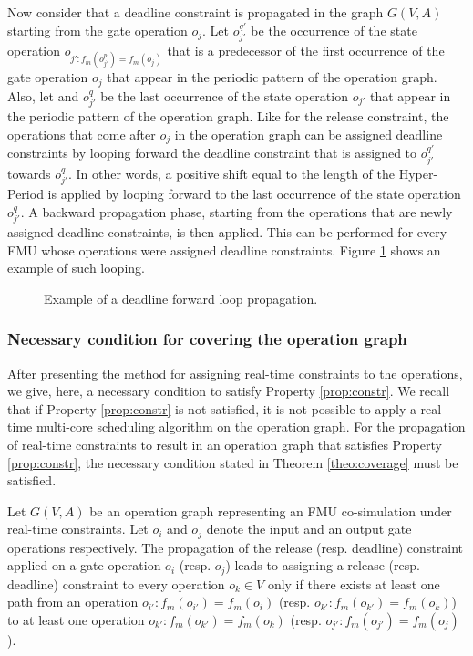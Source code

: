 Now consider that a deadline constraint is propagated in the graph $G(V,A)$ starting from the gate operation $o_j$. Let $o_{j'}^{q'}$ be the occurrence of the state operation $o_{j': f_m(o_{j'}^p) = f_m(o_j)}$ that is a predecessor of the first occurrence of the gate operation $o_j$ that appear in the periodic pattern of the operation graph. Also, let and $o_{j'}^q$ be the last occurrence of the state operation $o_{j'}$ that appear in the periodic pattern of the operation graph. Like for the release constraint, the operations that come after $o_j$ in the operation graph can be assigned deadline constraints by looping forward the deadline constraint that is assigned to $o_{j'}^{q'}$ towards $o_{j'}^q$. In other words, a positive shift equal to the length of the Hyper-Period is applied by looping forward to the last occurrence of the state operation $o_{j'}^q$. A backward propagation phase, starting from the operations that are newly assigned deadline constraints, is then applied. This can be performed for every FMU whose operations were assigned deadline constraints. Figure \ref{fig:dloop} shows an example of such looping. 

\begin{figure}[phbt]
\centering

\caption{Example of a deadline forward loop propagation.}
\label{fig:dloop}
\end{figure}   

\subsubsection{Necessary condition for covering the operation graph}

After presenting the method for assigning real-time constraints to the operations, we give, here, a necessary condition to satisfy Property \ref{prop:constr}. We recall that if Property \ref{prop:constr} is not satisfied, it is not possible to apply a real-time multi-core scheduling algorithm on the operation graph. For the propagation of real-time constraints to result in an operation graph that satisfies Property \ref{prop:constr}, the necessary condition stated in Theorem \ref{theo:coverage} must be satisfied.

\begin{theorem}
Let $G(V,A)$ be an operation graph representing an FMU co-simulation under real-time constraints. Let $o_i$ and $o_j$ denote the input and an output gate operations respectively. The propagation of the release (resp. deadline) constraint applied on a gate operation $o_i$ (resp. $o_j$) leads to assigning a release (resp. deadline) constraint to every operation $o_k \in V$ only if there exists at least one path from an operation $o_{i'}: f_m(o_{i'}) = f_m(o_{i})$ (resp. $o_{k'} : f_m(o_{k'}) = f_m(o_k)$) to at least one operation $o_{k'} : f_m(o_{k'}) = f_m(o_k)$ (resp. $o_{j'}: f_m(o_{j'}) = f_m(o_j)$).  
\label{theo:coverage}
\end{theorem}

